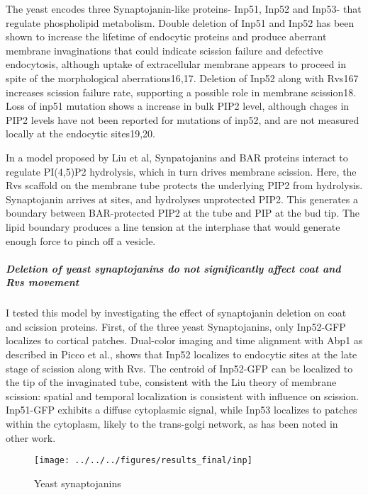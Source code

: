 	\vspace{5mm}
	The yeast encodes three Synaptojanin-like proteins- Inp51, Inp52 and Inp53- that regulate phospholipid metabolism. Double deletion of Inp51 and Inp52 has been shown to increase the lifetime of endocytic proteins and produce aberrant membrane invaginations that could indicate scission failure and defective endocytosis, although uptake of extracellular membrane appears to proceed in spite of the morphological aberrations16,17. Deletion of Inp52 along with Rvs167 increases scission failure rate, supporting a possible role in membrane scission18. Loss of inp51 mutation shows a increase in bulk PIP2 level, although chages in PIP2 levels have not been reported for mutations of inp52, and are not measured locally at the endocytic sites19,20.

	\vspace{5mm}
	In a model proposed by Liu et al, Synpatojanins and BAR proteins interact to regulate PI(4,5)P2 hydrolysis, which in turn drives membrane scission. Here, the Rvs scaffold on the membrane tube protects the underlying PIP2 from hydrolysis. Synaptojanin arrives at sites, and hydrolyses unprotected PIP2. This generates a boundary between BAR-protected PIP2 at the tube and PIP at the bud tip. The lipid boundary produces a line tension at the interphase that would generate enough force to pinch off a vesicle. 

	\vspace{5mm}
	
\subparagraph{Deletion of yeast synaptojanins do not significantly affect coat and Rvs movement }


	I tested this model by investigating the effect of synaptojanin deletion on coat and scission proteins. First, of the three yeast Synaptojanins, only Inp52-GFP localizes to cortical patches. Dual-color imaging and time alignment with Abp1 as described in Picco et al., shows that Inp52 localizes to endocytic sites at the late stage of scission along with Rvs. The centroid of Inp52-GFP can be localized to the tip of the invaginated tube, consistent with the Liu theory of membrane scission: spatial and temporal localization is consistent with influence on scission. Inp51-GFP exhibits a diffuse cytoplasmic signal, while Inp53 localizes to patches within the cytoplasm, likely to the trans-golgi network, as has been noted in other work. 

	\begin{figure}
	\centering
	\texttt{[image: ../../../figures/results\_final/inp]}
	\caption{Yeast synaptojanins \label{fig4_inp}}
	\end{figure}

